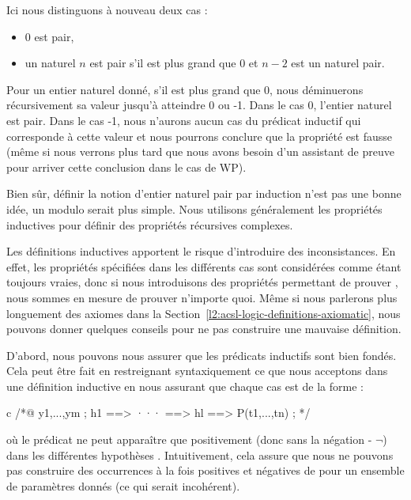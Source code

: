 

Ici nous distinguons à nouveau deux cas :

\begin{itemize}
\item 0 est pair,
\item un naturel $n$ est pair s'il est plus grand que $0$ et $n-2$ est un
      naturel pair.
\end{itemize}


Pour un entier naturel donné, s'il est plus grand que 0, nous déminuerons
récursivement sa valeur jusqu'à atteindre 0 ou -1. Dans le cas 0, l'entier
naturel est pair. Dans le cas -1, nous n'aurons aucun cas du prédicat inductif
qui corresponde
à cette valeur et nous pourrons conclure que la propriété est fausse (même si
nous verrons plus tard que nous avons besoin d'un assistant de preuve pour
arriver cette conclusion dans le cas de WP).





Bien sûr, définir la notion d'entier naturel pair par induction n'est pas une
bonne idée, un modulo serait plus simple. Nous utilisons généralement les
propriétés inductives pour définir des propriétés récursives complexes.




Les définitions inductives apportent le risque d'introduire des inconsistances.
En effet, les propriétés spécifiées dans les différents cas sont considérées
comme étant toujours vraies, donc si nous introduisons des propriétés permettant
de prouver , nous sommes en mesure de prouver n'importe quoi.
Même si nous parlerons plus longuement des axiomes dans la
Section~\ref{l2:acsl-logic-definitions-axiomatic}, nous pouvons donner quelques
conseils pour ne pas construire une mauvaise définition.


D'abord, nous pouvons nous assurer que les prédicats inductifs sont bien fondés.
Cela peut être fait en restreignant syntaxiquement ce que nous acceptons dans
une définition inductive en nous assurant que chaque cas est de la forme :

\begin{CodeBlock}{c}
/*@
  \forall y1,...,ym ; h1 ==> ··· ==> hl ==> P(t1,...,tn) ;
*/
\end{CodeBlock}


où le prédicat  ne peut apparaître que positivement (donc sans la
négation \CodeInline{!} - $\neg$) dans les différentes hypothèses .
Intuitivement, cela assure que nous ne pouvons pas construire des occurrences à la
fois positives et négatives de  pour un ensemble de paramètres donnés
(ce qui serait incohérent).



